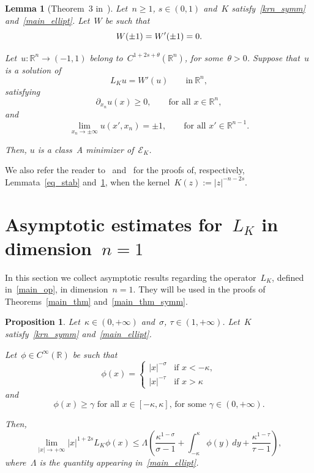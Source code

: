 \documentclass[10pt,a4paper]{amsart}
\newtheorem{prop}[theorem]{Proposition}
\newtheorem{lemma}[theorem]{Lemma}
\numberwithin{equation}{section}
\newcommand{\Rn}{\mathbb{R}^n}
\newcommand{\R}{\mathbb{R}}
\newcommand{\snr}[1]{\lvert #1\rvert}
\newcommand{\Ec}{\mathcal{E}_K}
\renewcommand{\geqslant}{\geq}
\begin{document}
    \begin{lemma}[Theorem~3 in~\cite{CP16}]\label{lemma:degiorgi} Let~$n \geq 1$, $s\in (0,1)$ and~${K}$ satisfy~\eqref{krn_symm} and~\eqref{main_ellipt}. Let~$W$ be such that
   \[W(\pm 1) = W\rq{}(\pm 1) =0. \] 
   
    Let~$u: \Rn \to (-1,1)$ belong to~$C^{1+2s+{\theta}}(\Rn)$, for some~${\theta} >0$. Suppose that~$u$ is a solution of
    	\begin{equation*}
    		L_K u = W'(u)\qquad \mbox{in} \ \Rn,
    	\end{equation*}
    	satisfying 
    	$$
    	\partial_{x_n} u(x) \geqslant 0, \qquad {\mbox{for all }} x \in \Rn,
    	$$
    	and
    	$$
    	\lim_{x_n\to \pm \infty} u(x',x_n) = \pm 1, \qquad {\mbox{for all }}  x' \in \R^{n-1}.
    	$$
    
    	Then, $u$ is a class~A minimizer of~$\Ec$.
    \end{lemma}

We also refer the reader to~\cite[Lemma 7]{PSV13} and~\cite[Theorem 1]{PSV13} for the proofs of, respectively, Lemmata~\ref{eq_stab} and~\ref{lemma:degiorgi}, when the kernel~${K}(z) :=\snr{z}^{-n-2s}$.

\section{Asymptotic estimates for~${L}_K$ in dimension~$n=1$}\label{90fxd9916}
 
In this section we collect asymptotic results regarding the operator~${L}_K$, defined in~\eqref{main_op}, in dimension~$n=1$. They will be used in the proofs of Theorems~\ref{main_thm} and~\ref{main_thm_symm}.

\begin{prop}\label{tonto}
Let~$\kappa\in (0, +\infty)$ and~$\sigma$, $\tau\in(1,+\infty)$. Let~$K$ satisfy~\eqref{krn_symm} and~\eqref{main_ellipt}. 

Let~$\phi \in C^{\infty}(\R)$ be such that
\begin{equation*}
\phi(x)= \begin{cases}
|x|^{-\sigma} &\mbox{if } x<-\kappa, \\
|x|^{-\tau} &\mbox{if } x>\kappa
\end{cases}
\end{equation*}
and
\begin{equation}\label{addipotesi76}
{\mbox{$\phi(x)\ge\gamma$ for all~$x\in[-\kappa,\kappa]$, for some~$\gamma\in(0,+\infty)$.}}
\end{equation}

Then,
\begin{equation}\label{yuuy_secs}
\lim_{|x | \to  +\infty} |x|^{1+2s} {L}_K\phi(x) \leq \Lambda \left( \frac{\kappa^{1-\sigma}}{\sigma-1}+ \int_{-\kappa}^{\kappa} \phi(y) \, dy+\frac{\kappa^{1-\tau}}{\tau-1}\right),
\end{equation}
where~$\Lambda$ is the quantity appearing in~\eqref{main_ellipt}.
\end{prop}
\end{document}
